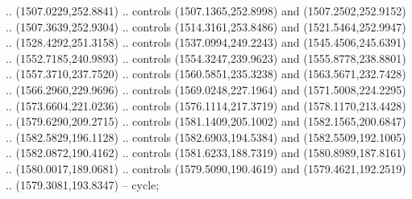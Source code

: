 \begin{scope}[shift={(-22.88722,-49.76189)}]
\begin{scope}[shift={(-739.46591,328.36782)}]
      .. (1507.0229,252.8841) .. controls (1507.1365,252.8998) and
      (1507.2502,252.9152) .. (1507.3639,252.9304) .. controls (1514.3161,253.8486)
      and (1521.5464,252.9947) .. (1528.4292,251.3158) .. controls
      (1537.0994,249.2243) and (1545.4506,245.6391) .. (1552.7185,240.9893) ..
      controls (1554.3247,239.9623) and (1555.8778,238.8801) .. (1557.3710,237.7520)
      .. controls (1560.5851,235.3238) and (1563.5671,232.7428) ..
      (1566.2960,229.9696) .. controls (1569.0248,227.1964) and (1571.5008,224.2295)
      .. (1573.6604,221.0236) .. controls (1576.1114,217.3719) and
      (1578.1170,213.4428) .. (1579.6290,209.2715) .. controls (1581.1409,205.1002)
      and (1582.1565,200.6847) .. (1582.5829,196.1128) .. controls
      (1582.6903,194.5384) and (1582.5509,192.1005) .. (1582.0872,190.4162) ..
      controls (1581.6233,188.7319) and (1580.8989,187.8161) .. (1580.0017,189.0681)
      .. controls (1579.5090,190.4619) and (1579.4621,192.2519) ..
      (1579.3081,193.8347) -- cycle;


\end{scope}
\end{scope}
